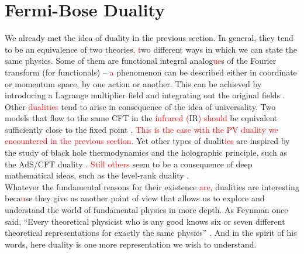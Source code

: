         \section{Fermi-Bose Duality} \label{Fermi-Bose_sec}
        We already met the idea of duality in the previous section. In general, they tend to be an equivalence of two theories\textcolor{red}{, t}wo different ways in which we can state the same physics. Some of them are functional integral analog\textcolor{red}{ue}s of the Fourier transform (for functionals) -- \textcolor{red}{a} phenomenon can be described either in coordinate or momentum space, by one action or another. This can be achieved by introducing a Lagrange multiplier field and integrating out the original fields \textcolor{red}{\cite{Barci:1995iy, Burgess:1993np, Fradkin:1994tt, Kapustin:1999ha}}. Other \textcolor{red}{dualities} tend to arise in consequence of the idea of universality. Two models that flow to the same CFT in the \textcolor{red}{infrared} \textcolor{red}{(}IR\textcolor{red}{)} \textcolor{red}{should} be equivalent sufficiently close to the fixed point \textcolor{red}{\cite{Seiberg:1994bz, Seiberg:1994rs}}. \textcolor{red}{This is the case with the PV duality we encountered in the previous section.}
        Yet other types of dualit\textcolor{red}{ies} are inspired by the study of black hole thermodynamics and the holographic principle, such as the AdS/CFT duality \textcolor{red}{\cite{Maldacena:1997re}}. \textcolor{red}{Still others} seem to be a consequence of deep mathematical ideas, such as the level-rank duality \textcolor{red}{\cite{Nakanishi:1990hj, Mlawer:1990uv, Naculich:2007nc, Naculich:1990pa, Camperi:1990dk}}.\\
        \indent Whatever the fundamental reasons for their existence \textcolor{red}{are}, dualities are interesting beca\textcolor{red}{u}se they give us another point of view that allows us to explore and understand the world of fundamental physics in more depth. As Feynman once said, ``Every theoretical physicist who is any good knows six or seven different theoretical representations for exactly the same physics'' \cite{Feynman_quote}. And in the spirit of his words, here duality is one more representation we wish to understand.\\
